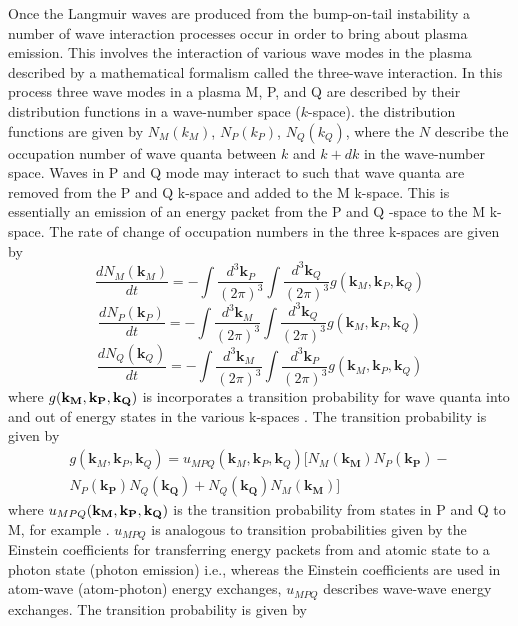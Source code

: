 Once the Langmuir waves are produced from the bump-on-tail instability a number of wave interaction processes occur in order to bring about plasma emission. This involves the interaction of various wave modes in the plasma described by a mathematical formalism called the three-wave interaction. In this process three wave modes in a plasma M, P, and Q are described by their distribution functions in a wave-number space ($k$-space). the distribution functions are given by $N_M(k_M)$, $N_P(k_P)$, $N_Q(k_Q)$, where the $N$ describe the occupation number of wave quanta between $k$ and $k+dk$ in the wave-number space. Waves in P and Q mode may interact to such that wave quanta are removed from the P and Q k-space and added to the M k-space. This is essentially an emission of an energy packet from the P and Q -space to the M k-space. The rate of change of occupation numbers in the three k-spaces are given by
\begin{equation}
\frac{dN_M(\mathbf{k}_M)}{dt} = -\int \frac{d^3\mathbf{k}_P}{(2\pi)^3}\int \frac{d^3\mathbf{k}_Q}{(2\pi)^3}g(\mathbf{k}_M, \mathbf{k}_P, \mathbf{k}_Q)
\end{equation}
\begin{equation}
\frac{dN_P(\mathbf{k}_P)}{dt} = -\int \frac{d^3\mathbf{k}_M}{(2\pi)^3}\int \frac{d^3\mathbf{k}_Q}{(2\pi)^3}g(\mathbf{k}_M, \mathbf{k}_P, \mathbf{k}_Q)
\end{equation}
\begin{equation}
\frac{dN_Q(\mathbf{k}_Q)}{dt} = -\int \frac{d^3\mathbf{k}_M}{(2\pi)^3}\int \frac{d^3\mathbf{k}_P}{(2\pi)^3}g(\mathbf{k}_M, \mathbf{k}_P, \mathbf{k}_Q)
\end{equation}
where $g(\bf{k}_M, \bf{k}_P, \bf{k}_Q)$ is incorporates a transition probability for wave quanta into and out of energy states in the various k-spaces \citep{robinson1994}. The transition probability is given by
\begin{multline}
g(\mathbf{k}_M, \mathbf{k}_P, \mathbf{k}_Q) = u_{MPQ}(\mathbf{k}_M, \mathbf{k}_P, \mathbf{k}_Q)   [N_M(\mathbf{k_M}) N_P(\mathbf{k_P})  - \\ 
N_P(\mathbf{k_P}) N_Q(\mathbf{k_Q})   +N_Q(\mathbf{k_Q}) N_M(\mathbf{k_M})  ]
\end{multline}
where $u_{MPQ}(\bf{k}_M, \bf{k}_P, \bf{k}_Q) $ is the transition probability from states in P and Q  to M, for example \citep{melrose1986}. $u_{MPQ}$ is analogous to transition probabilities given by the Einstein coefficients for transferring energy packets from and atomic state to a photon state (photon emission) i.e., whereas the Einstein coefficients are used in atom-wave (atom-photon) energy exchanges, $u_{MPQ}$ describes wave-wave energy exchanges. The transition probability is given by
